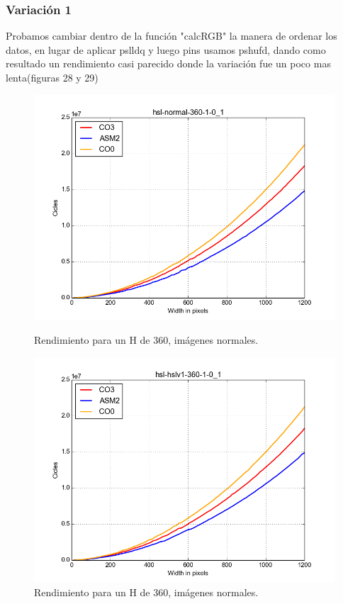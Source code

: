\documentclass[a4paper]{article}
\begin{document}
\subsubsection{Variación 1}
Probamos cambiar dentro de la función "calcRGB" la manera de ordenar los datos, en lugar de aplicar pslldq y luego pins usamos pshufd, dando como resultado un rendimiento casi parecido donde la variación fue un poco mas lenta(figuras 28 y 29)

\begin{figure}[H]
  \begin{center}
    \includegraphics[scale=0.4]{imagenes/hsl5.png}
    \caption{Rendimiento para un H de 360, imágenes normales.}
    \label{fig:exp1-1}
  \end{center}
  \endminipage\hfill
  \begin{center}
    \includegraphics[scale=0.4]{imagenes/hsl8.png}
    \caption{Rendimiento para un H de 360, imágenes normales.}
    \label{fig:exp1-0.5}
  \end{center}
  \endminipage\hfill
\end{figure}
\end{document}

